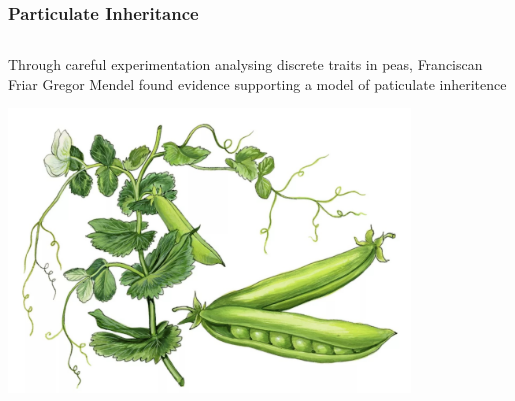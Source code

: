 \documentclass{beamer}
\begin{document}
\begin{frame}
	
	\frametitle{Particulate Inheritance}
	
	\begin{columns}[T]
		
		\begin{column}{0.6\textwidth}
			
			Through careful experimentation analysing discrete traits in peas, Franciscan Friar Gregor Mendel found evidence supporting a model of paticulate inheritence
			
			\vspace{10pt}
			
			\includegraphics[keepaspectratio, width  =0.8\textwidth]{img/peas}
			

\end{column}
\end{columns}
\end{frame}
\end{document}

